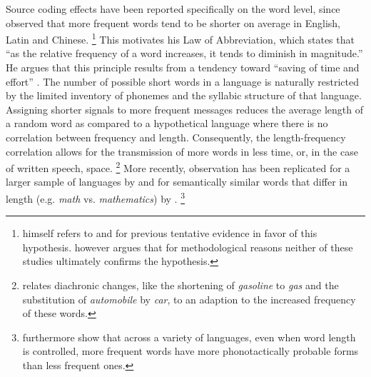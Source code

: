 Source coding effects have been reported specifically on the word level, since \citet{zipf1935} observed that more frequent words tend to be shorter on average in English, Latin and Chinese.%
%
\footnote{\citeauthor{zipf1935} himself refers to \citet{kaeding1897} and \citet{eldridge1911} for previous tentative evidence in favor of this hypothesis. \citet[23--25]{zipf1935} however argues that for methodological reasons neither of these studies ultimately confirms the hypothesis.}\afterfn%
%
This motivates his Law of Abbreviation, which states that ``as the relative frequency of a word increases, it tends to diminish in magnitude.'' He argues that this principle results from a tendency toward ``saving of time and effort'' \citep[38]{zipf1935}. The number of possible short words in a language is naturally restricted by the limited inventory of phonemes and the syllabic structure of that language. Assigning shorter signals to more frequent messages reduces the average length of a random word as compared to a hypothetical language where there is no correlation between frequency and length. Consequently, the length-frequency correlation allows for the transmission of more words in less time, or, in the case of written speech, space.%
%
\footnote{\citet[30-36]{zipf1935} relates diachronic changes, like the shortening of \textit{gasoline} to \textit{gas} and the substitution of \textit{automobile} by \textit{car}, to an adaption to the increased frequency of these words.}\afterfn%
%
More recently,  observation has been replicated for a larger sample of languages by \citet{piantadosi.etal2011} and for semantically similar words that differ in length (e.g. \textit{math} vs. \textit{mathematics}) by \citet{mahowald.etal2013}.%
%
\footnote{\citet{mahowald.etal2018} furthermore show that across a variety of languages, even when word length is controlled, more frequent words have more phonotactically probable forms than less frequent ones.}\afterfn%
%

